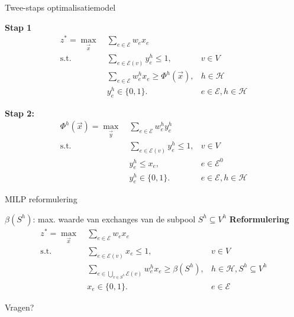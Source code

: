 \documentclass{beamer}
\newcommand{\hospitals}{\mathcal{H}}
\newcommand{\exchanges}{\mathcal{E}}
\begin{document}
\begin{frame}{Twee-staps optimalisatiemodel}
\vspace{1.5ex}
{\small
	\textbf{Stap 1}
	\begin{align}
		z^{*} = \max_{\vec{x}}~& \sum_{e \in \exchanges} w_{e} x_{e}		 							& \label{obj:upper-level} 				 					\\
		\textrm{s.t.}~& \sum_{e \in \exchanges(v)} y_{e}^{h} 			 \le 1, 					& v \in V \label{con:upper-level:packing} 					\\
		~& \sum_{e \in \exchanges} w_{e}^{h} x_{e} \ge \Phi^{h}(\vec{x}), & h \in \hospitals \label{con:upper-level:shared} \\
		~&y_{e}^{h}	\in \{0,1\}. & e \in \exchanges, h \in \hospitals \label{var:upper-level}										
	\end{align}

	\textbf{Stap 2:}
	\begin{align}
		\Phi^{h}(\vec{x}) = \max_{\vec{y}}~& \sum_{e \in \exchanges} w_{e}^{h} y_{e}^{h} & \label{obj:lower-level} \\
		\textrm{s.t.}~& \sum_{e \in \exchanges(v)} y_{e}^{h} \le 1, & v \in V \label{con:lower-level:packing} \\
		~& y_{e}^{h} \le x_{e}, & e \in \exchanges^{0} \label{con:lower-level:shared} \\
		~&y_{e}^{h}	\in \{0,1\}. & e \in \exchanges, h \in \hospitals \label{var:lower-level}										
	\end{align}
}
	
\end{frame}

\begin{frame}{MILP reformulering}

	$\beta(S^{h})$: \hfill max. waarde van exchanges van de subpool $S^{h} \subseteq V^{h}$
	\vfill\textbf{Reformulering}
	\begin{align}
		z^{*} = \max_{\vec{x}}~& \sum_{e \in \exchanges} w_{e} x_{e} & \label{obj:single-level} \\
		\textrm{s.t.}~& \sum_{e \in \exchanges(v)} x_{e} \le 1, & v \in V \label{con:single-level:packing} 					\\
		~& \sum_{e \in \bigcup\limits_{v \in S^{h}} \exchanges(v)} w_{e}^{h} x_{e} \ge \beta(S^{h}), & h \in \hospitals, S^{h} \subseteq V^{h} \label{con:single-level:subsets} \\
		~&x_{e}	\in \{0,1\}. & e \in \exchanges \label{var:single-level}										
	\end{align}
\end{frame}

\begin{frame}
	\Huge\centering Vragen? 
\end{frame}
\end{document}
